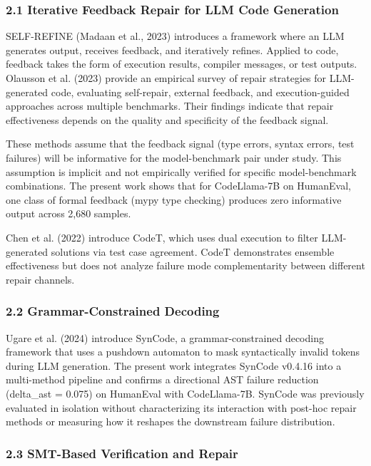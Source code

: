 
\subsubsection{2.1 Iterative Feedback Repair for LLM Code Generation}

SELF-REFINE (Madaan et al., 2023) introduces a framework where an LLM generates output, receives feedback, and iteratively refines. Applied to code, feedback takes the form of execution results, compiler messages, or test outputs. Olausson et al. (2023) provide an empirical survey of repair strategies for LLM-generated code, evaluating self-repair, external feedback, and execution-guided approaches across multiple benchmarks. Their findings indicate that repair effectiveness depends on the quality and specificity of the feedback signal.

These methods assume that the feedback signal (type errors, syntax errors, test failures) will be informative for the model-benchmark pair under study. This assumption is implicit and not empirically verified for specific model-benchmark combinations. The present work shows that for CodeLlama-7B on HumanEval, one class of formal feedback (mypy type checking) produces zero informative output across 2,680 samples.

Chen et al. (2022) introduce CodeT, which uses dual execution to filter LLM-generated solutions via test case agreement. CodeT demonstrates ensemble effectiveness but does not analyze failure mode complementarity between different repair channels.

\subsubsection{2.2 Grammar-Constrained Decoding}

Ugare et al. (2024) introduce SynCode, a grammar-constrained decoding framework that uses a pushdown automaton to mask syntactically invalid tokens during LLM generation. The present work integrates SynCode v0.4.16 into a multi-method pipeline and confirms a directional AST failure reduction (delta_ast = 0.075) on HumanEval with CodeLlama-7B. SynCode was previously evaluated in isolation without characterizing its interaction with post-hoc repair methods or measuring how it reshapes the downstream failure distribution.

\subsubsection{2.3 SMT-Based Verification and Repair}

